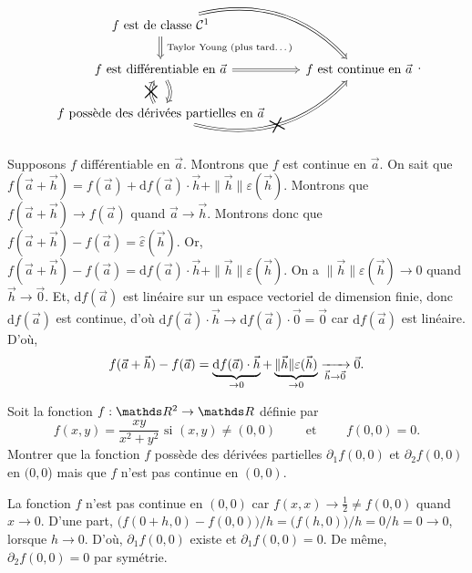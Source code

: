 \begin{prop}
	\[
		\begin{tikzcd}
			f \text{ est de classe } \mathcal{C}^1 \arrow[d, Rightarrow, "\text{ Taylor Young (plus tard\ldots)}"] \arrow[dr, Rightarrow, bend left]\\
			f \text{ est différentiable en } \vec{a} \arrow[r, Rightarrow] \arrow[d, Rightarrow, bend left]\arrow[d, Leftarrow, bend right, "\text{\huge$\times$}"{anchor=center, sloped}] & f \text{ est continue en }\vec{a}\\
			f \text{ possède des dérivées partielles en } \vec{a} \arrow[ru, Rightarrow, bend right, "\text{\huge$\times$}"{anchor=center, sloped}]
		\end{tikzcd}
	.\]
\end{prop}

\begin{prv}
	Supposons $f$ différentiable en $\vec{a}$. Montrons que $f$ est continue en $\vec{a}$.
	On sait que $f(\vec{a} + \vec{h}) = f(\vec{a}) + \mathrm{d}f(\vec{a}) \cdot \vec{h} + \|\vec{h}\| \varepsilon(\vec{h})$.
	Montrons que $f(\vec{a} + \vec{h}) \to f(\vec{a})$ quand $\vec{a} \to \vec{h}$.
	Montrons donc que $f(\vec{a} + \vec{h}) - f(\vec{a}) = \hat\varepsilon(\vec{h})$.
	Or, $f(\vec{a} + \vec{h}) - f(\vec{a}) = \mathrm{d}f(\vec{a}) \cdot \vec{h} + \|\vec{h}\| \varepsilon(\vec{h})$.
	On a $\|\vec{h}\| \varepsilon(\vec{h}) \to 0$ quand $\vec{h} \to \vec{0}$.
	Et, $\mathrm{d}f(\vec{a})$ est linéaire sur un espace vectoriel de dimension finie, donc $\mathrm{d}f(\vec{a})$ est continue, d'où $\mathrm{d}f(\vec{a}) \cdot \vec{h} \to \mathrm{d}f(\vec{a})\cdot \vec{0} = \vec{0}$ car $\mathrm{d}f(\vec{a})$ est linéaire.
	D'où, \[
		f(\vec{a} + \vec{h}) - f(\vec{a}) = \underbrace{\mathrm{d}f(\vec{a}) \cdot \vec{h}}_{\to 0} + \underbrace{\|\vec{h}\| \varepsilon(\vec{h})}_{\to 0} \xrightarrow[\vec{h} \to \vec{0}]{} \vec{0}
	.\]
\end{prv}

\begin{exo}
	\begin{slshape}
		Soit la fonction $f : \R^2 \to \R$ définie par \[
			f(x,y) = \frac{xy}{x^2 + y^2} \text{ si } (x,y) \neq (0,0) \quad\quad \text{ et } \quad\quad f(0,0) = 0
		.\]
		Montrer que la fonction $f$ possède des dérivées partielles $\partial_1 f(0,0)$ et $\partial_2 f(0,0)$ en $(0,0$) mais que $f$ n'est pas continue en $(0,0)$.
	\end{slshape}

	La fonction $f$ n'est pas continue en $(0, 0)$ car $f(x,x) \to \frac{1}{2} \neq f(0,0)$ quand $x\to 0$.
	D'une part, $\big(f(0+h, 0) - f(0,0)\big)/h = \big(f(h,0)\big)/h = 0 / h = 0 \to 0$, lorsque $h \to 0$. D'où, $\partial_1 f(0,0)$ existe et $\partial_1 f(0,0) = 0$.
	De même, $\partial_2 f(0,0) = 0$ par symétrie.
\end{exo}

